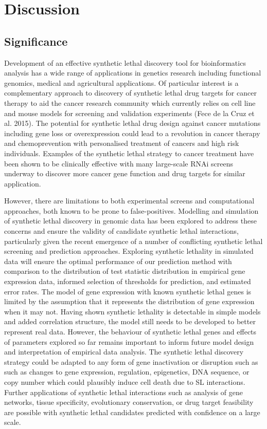 \chapter{Discussion}
\label{chap:discussion}


\section{Significance}
\label{chap6:significance}

Development of an effective synthetic lethal discovery tool for bioinformatics analysis has a wide range of applications in genetics research including functional genomics, medical and agricultural applications.   Of particular interest is a complementary approach to discovery of synthetic lethal drug targets for cancer therapy to aid the cancer research community which currently relies on cell line and mouse models for screening and validation experiments (Fece de la Cruz et al. 2015).  The potential for synthetic lethal drug design against cancer mutations including gene loss or overexpression could lead to a revolution in cancer therapy and chemoprevention with personalised treatment of cancers and high risk individuals.  Examples of the synthetic lethal strategy to cancer treatment have been shown to be clinically effective with many large-scale RNAi screens underway to discover more cancer gene function and drug targets for similar application.

However, there are limitations to both experimental screens and computational approaches, both known to be prone to false-positives.  Modelling and simulation of synthetic lethal discovery in genomic data has been explored to address these concerns and ensure the validity of candidate synthetic lethal interactions, particularly given the recent emergence of a number of conflicting synthetic lethal screening and prediction approaches.  Exploring synthetic lethality in simulated data will ensure the optimal performance of our prediction method with comparison to the distribution of test statistic distribution in empirical gene expression data, informed selection of thresholds for prediction, and estimated error rates.  The model of gene expression with known synthetic lethal genes is limited by the assumption that it represents the distribution of gene expression when it may not.  Having shown synthetic lethality is detectable in simple models and added correlation structure, the model still needs to be developed to better represent real data.  However, the behaviour of synthetic lethal genes and effects of parameters explored so far remains important to inform future model design and interpretation of empirical data analysis.
The synthetic lethal discovery strategy could be adapted to any form of gene inactivation or disruption such as such as changes to gene expression, regulation, epigenetics, DNA sequence, or copy number which could plausibly induce cell death due to SL interactions.  Further applications of synthetic lethal interactions such as analysis of gene networks, tissue specificity, evolutionary conservation, or drug target feasibility are possible with synthetic lethal candidates predicted with confidence on a large scale.

